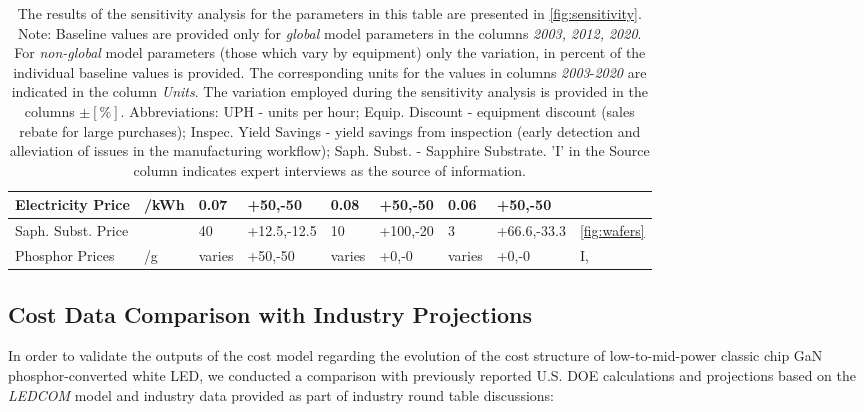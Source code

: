 \documentclass[parskip=full]{article}
\begin{document}
\begin{table}[]
\begin{NiceTabularX}{1.1\textwidth}{ |X|X|l|l|l|l|l|l|X|}
        \hline
            Electricity Price & /kWh & 0.07 & +50,-50 & 0.08 & +50,-50 & 0.06 & +50,-50 & \cite{eia2000electric}\cite{eia2019electric} \\
        \hline
            Saph. Subst. Price &  & 40 & +12.5,-12.5 & 10 & +100,-20 & 3 & +66.6,-33.3 & \cref{fig:wafers} \\
        \hline
            Phosphor Prices & /g & varies & +50,-50 & varies & +0,-0 & varies & +0,-0 & I, \cite{yole_phosphor_2012}\cite{yole2017phosphor} \\
        \hline
        \end{NiceTabularX}
    \vspace{2mm}
    \caption*{The results of the sensitivity analysis for the parameters in this table are presented in \cref{fig:sensitivity}. Note: Baseline values are provided only for \textit{global} model parameters in the columns \textit{2003, 2012, 2020}. For \textit{non-global} model parameters (those which vary by equipment) only the variation, in percent of the individual baseline values is provided. The corresponding units for the values in columns \textit{2003}-\textit{2020} are indicated in the column \textit{Units}. The variation employed during the sensitivity analysis is provided in the columns $\pm [\%]$. Abbreviations: UPH - units per hour; Equip. Discount - equipment discount (sales rebate for large purchases); Inspec. Yield Savings - yield savings from inspection (early detection and alleviation of issues in the manufacturing workflow); Saph. Subst. - Sapphire Substrate. ’I’ in the Source column indicates expert interviews as the source of information.}
    \label{tab:sensitivity}
\end{table}

\clearpage
\subsection{Cost Data Comparison with Industry Projections}
\label{sec:cost_model_calibration}

In order to validate the outputs of the cost model regarding the evolution of the cost structure of low-to-mid-power classic chip GaN phosphor-converted white LED, we conducted a comparison with previously reported U.S. DOE calculations and projections based on the \textit{LEDCOM} model and industry data provided as part of industry round table discussions:
\end{document}

